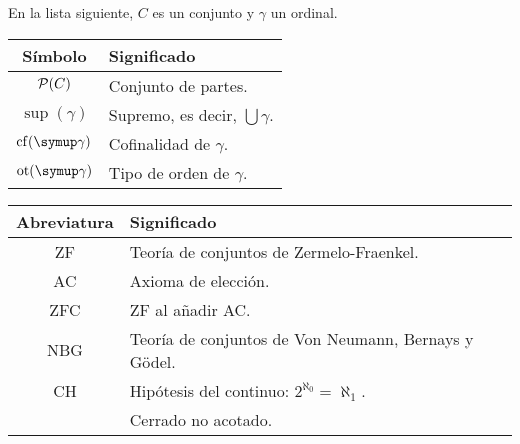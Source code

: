 \documentclass
[
  12pt,
  letterpaper,
  openany,
  oneside,
]{book}
\begin{document}
En la lista siguiente, $C$ es un conjunto y $\gamma$ un ordinal.

\begin{center}
    \begin{tabular}{cl}
        Símbolo & Significado \\
        \hline\noalign{\smallskip}
        $\pwset{C}$ & Conjunto de partes.\\
        $\sup(\gamma)$ & Supremo, es decir, $\bigcup \gamma$.\\
        $\cf(\gamma)$ & Cofinalidad de $\gamma$.\\
        $\ot(\gamma)$ & Tipo de orden de $\gamma$.
    \end{tabular}
\end{center}

\newpage
{}

\begin{center}
    \begin{tabular}{cl}
        Abreviatura & Significado \\
        \hline\noalign{\smallskip}
        ZF & Teoría de conjuntos de Zermelo-Fraenkel.\\
        AC & Axioma de elección.\\
        ZFC & ZF al añadir AC.\\
        NBG & Teoría de conjuntos de Von Neumann, Bernays y Gödel.\\
        CH & Hipótesis del continuo: $2^{\aleph_0} = \aleph_1$. \\
        \cna{} & Cerrado no acotado. \\
    \end{tabular}
\end{center}
\fi
\mainmatter
\pagestyle{headings}
\makeatletter
\gdef\@oddhead{\hfil\thepage}
\makeatother
\ifintro
{}
\thispagestyle{empty}
\end{document}

